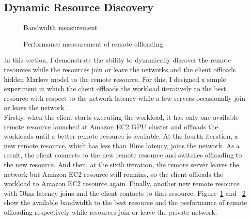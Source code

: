 \subsection{Dynamic Resource Discovery}
\label{offloading:dynamic}
%
\begin{figure}
\centering
{}
\caption{Bandwidth measurement}
\label{fig:dynamic_discovery1}
\end{figure}
%
\begin{figure}
\centering
{}
\caption{Performance measurement of remote offloading}
\label{fig:dynamic_discovery2}
\end{figure}
%
In this section, I demonstrate the ability to dynamically discover the
remote resources while the resources join or leave the networks and the
client offloads hidden Markov model to the remote resource.
%
For this, I designed a simple experiment in which the client offloads
the workload iteratively to the best resource with respect to the
network latency while a few servers occasionally join or leave the
network.\\
%
Firstly, when the client starts executing the workload, it has only one
available remote resource launched at Amazon EC2 GPU cluster and
offloads the workloads until a better remote resource is available.
%
At the fourth iteration, a new remote resource, which has less than 10ms
latency, joins the network.
%
As a result, the client connects to the new remote resource and switches
offloading to the new resource.
%
And then, at the sixth iteration, the remote server leaves the network
but Amazon EC2 resource still remains, so the client offloads the
workload to Amazon EC2 resource again.
%
Finally, another new remote resource with 50ms latency joins and the
client contacts to that resource.
%
Figure~\ref{fig:dynamic_discovery1} and ~\ref{fig:dynamic_discovery2} show the
available bandwidth to the best resource and the performance of remote
offloading respectively while resources join or leave the private
network.
%
